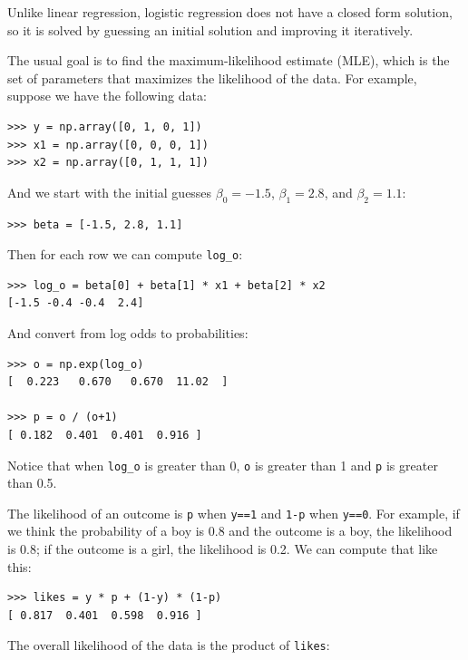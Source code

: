 \documentclass[12pt]{book}
\theoremstyle{exercise}
\begin{document}
Unlike linear regression, logistic regression does not have a
closed form solution, so it is solved by guessing an initial
solution and improving it iteratively.%
%

The usual goal is to find the maximum-likelihood estimate (MLE),
which is the set of parameters that maximizes the likelihood of the
data.  For example, suppose we have the following data:%
%

\begin{verbatim}
>>> y = np.array([0, 1, 0, 1])
>>> x1 = np.array([0, 0, 0, 1])
>>> x2 = np.array([0, 1, 1, 1])
\end{verbatim}

And we start with the initial guesses $\beta_0=-1.5$, $\beta_1=2.8$,
and $\beta_2=1.1$:

\begin{verbatim}
>>> beta = [-1.5, 2.8, 1.1]
\end{verbatim}

Then for each row we can compute \verb"log_o":

\begin{verbatim}
>>> log_o = beta[0] + beta[1] * x1 + beta[2] * x2 
[-1.5 -0.4 -0.4  2.4]
\end{verbatim}

And convert from log odds to probabilities:%

\begin{verbatim}
>>> o = np.exp(log_o)
[  0.223   0.670   0.670  11.02  ]

>>> p = o / (o+1)
[ 0.182  0.401  0.401  0.916 ]
\end{verbatim}

Notice that when \verb"log_o" is greater than 0, {\tt o}
is greater than 1 and {\tt p} is greater than 0.5.

The likelihood of an outcome is {\tt p} when {\tt y==1} and {\tt 1-p}
when {\tt y==0}.  For example, if we think the probability of a boy is
0.8 and the outcome is a boy, the likelihood is 0.8; if
the outcome is a girl, the likelihood is 0.2.  We can compute that
like this:%

\begin{verbatim}
>>> likes = y * p + (1-y) * (1-p)
[ 0.817  0.401  0.598  0.916 ]
\end{verbatim}

The overall likelihood of the data is the product of {\tt likes}:
\end{document}
